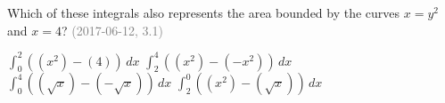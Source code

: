 \documentclass[12pt]{exam}
\newcommand{\questionDate}[1]{\textcolor{gray}{(#1)}}
\newcommand{\<}{\langle}
\renewcommand{\>}{\rangle}
\begin{document}
\begin{questions}
  \question
  Which of these integrals also
  represents the area bounded by the curves \(x=y^2\) and \(x=4\)?
  \questionDate{2017-06-12, 3.1}
  \begin{choices}
    \choice
      \(\int_0^2((x^2)-(4))\,dx\)
    \choice
      \(\int_2^4((x^2)-(-x^2))\,dx\)
    \CorrectChoice
      \(\int_0^4((\sqrt x)-(-\sqrt x))\,dx\)
    \choice
      \(\int_2^0((x^2)-(\sqrt x))\,dx\)
  \end{choices}
%
%
%
%
%
%
%
%
%
%
%
%
%
%

\end{questions}
\end{document}
